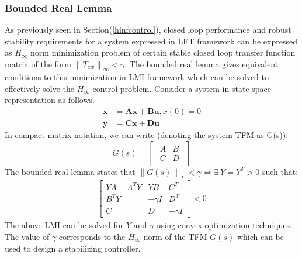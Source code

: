 \documentclass[a4paper,12pt]{article}
\newcommand\norm[1]{\left\lVert#1\right\rVert}
\begin{document}
	\subsubsection{Bounded Real Lemma}
	\label{brl}
	As previously seen in Section(\ref{hinfcontrol}), closed loop performance and robust stability requirements for a system expressed in LFT framework can be expressed as $H_{\infty}$ norm minimization problem of certain stable closed loop transfer function matrix of the form $\norm{T_{zw}}_{\infty} < \gamma$. 
	The bounded real lemma gives equivalent conditions to this minimization in LMI framework which can be solved to effectively solve the $H_{\infty}$ control problem. Consider a system in state space representation as follows.
	\begin{align}
	\label{ss}
		\textbf{\.x}&=\textbf{Ax} + \textbf{Bu}, x(0)=0\\
		\textbf{y}&=\textbf{Cx} + \textbf{Du}
		\end{align}
		In compact matrix notation, we can write (denoting the system TFM as G(s)):
		\[G(s)=\begin{bmatrix}
		\begin{array}{c|c}
		A & B \\\hline C & D
		\end{array}
		\end{bmatrix}
		\]
		The bounded real lemma states that 
		$\norm{G(s)}_{\infty}<\gamma \Leftrightarrow \exists \: Y = Y^{T} > 0$ such that:
		\begin{align}
		\label{brl_lmi}
		\begin{bmatrix}
		YA+A^{T}Y & YB & C^{T} \\
		B^{T}Y & -\gamma I & D^{T}\\
		C & D & -\gamma I
		\end{bmatrix}
		< 0
		\end{align}
		The above LMI can be solved for $Y$ and $\gamma$ using convex optimization techniques. The value of $\gamma$ corresponds to the $H_{\infty}$ norm of the TFM $G(s)$ which can be used to design a stabilizing controller. 
\end{document}
